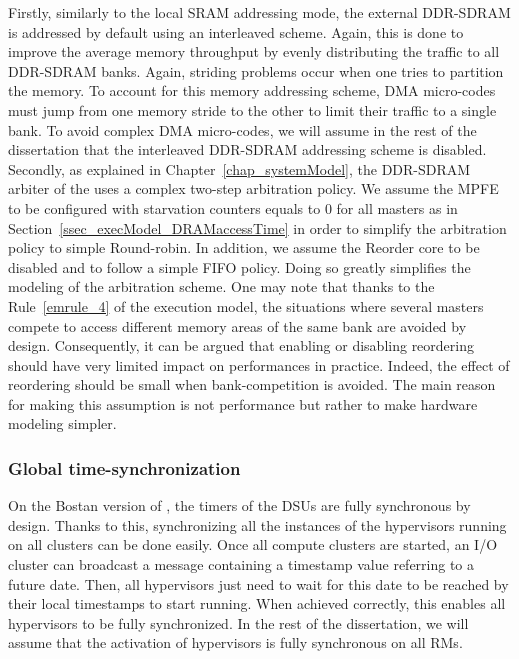 \documentclass[main.tex]{subfiles}
\begin{document}
\begin{description}
        Firstly, similarly to the local SRAM addressing mode, the external DDR-SDRAM is addressed by default using an interleaved scheme. Again, this is done to improve the average memory throughput by evenly distributing the traffic to all DDR-SDRAM banks. Again, striding problems occur when one tries to partition the memory. To account for this memory addressing scheme, DMA micro-codes must jump from one memory stride to the other to limit their traffic to a single bank. To avoid complex DMA micro-codes, we will assume in the rest of the dissertation that the interleaved DDR-SDRAM addressing scheme is disabled.
        Secondly, as explained in Chapter~\ref{chap_systemModel}, the DDR-SDRAM arbiter of the \mppalong uses a complex two-step arbitration policy. We assume the MPFE to be configured with starvation counters equals to 0 for all masters as in Section~\ref{ssec_execModel_DRAMaccessTime} in order to simplify the arbitration policy to simple Round-robin. In addition, we assume the Reorder core to be disabled and to follow a simple FIFO policy. Doing so greatly simplifies the modeling of the arbitration scheme. One may note that thanks to the Rule~\ref{emrule_4} of the execution model, the situations where several masters compete to access different memory areas of the same bank are avoided by design. Consequently, it can be argued that enabling or disabling reordering should have very limited impact on performances in practice. Indeed, the effect of reordering should be small when bank-competition is avoided. The main reason for making this assumption is not performance but rather to make hardware modeling simpler.
\end{description}

\subsubsection{Global time-synchronization}
On the Bostan version of \mppalong, the timers of the DSUs are fully synchronous by design.
Thanks to this, synchronizing all the instances of the hypervisors running on all clusters can be done easily. Once all compute clusters are started, an I/O cluster can broadcast a message containing a timestamp value referring to a future date. Then, all hypervisors just need to wait for this date to be reached by their local timestamps to start running. When achieved correctly, this enables all hypervisors to be fully synchronized. In the rest of the dissertation, we will assume that the activation of hypervisors is fully synchronous on all RMs.
\end{document}
